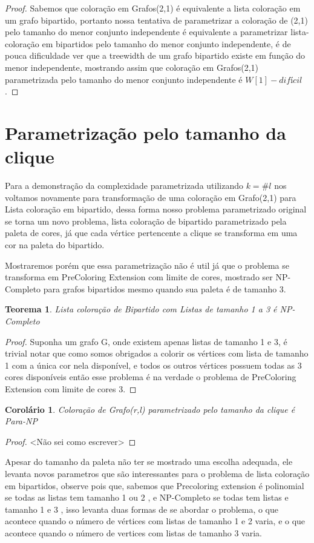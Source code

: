 \documentclass[a4paper,oneside,12pt]{book}
\newtheorem{teorema}{Teorema}
\newtheorem{corolario}{Corolário}
\begin{document}
\begin{proof}
Sabemos que coloração em Grafos(2,1) é equivalente a lista coloração em um grafo bipartido, portanto nossa tentativa de parametrizar a coloração de (2,1) pelo tamanho do menor conjunto independente é equivalente a parametrizar lista-coloração em bipartidos pelo tamanho do menor conjunto independente, é de pouca dificuldade ver que a treewidth de um grafo bipartido existe em função do menor independente, mostrando assim que coloração em Grafos(2,1) parametrizada pelo tamanho do menor conjunto independente é $W[1]-difícil$. 

\end{proof}

\section{Parametrização pelo tamanho da clique}
Para a demonstração da complexidade parametrizada utilizando $k=\#l$ nos voltamos novamente para transformação de uma coloração em Grafo(2,1) para Lista coloração em bipartido, dessa forma nosso problema parametrizado original se torna um novo problema, lista coloração de bipartido parametrizado pela paleta de cores, já que cada vértice pertencente a clique se transforma em uma cor na paleta do bipartido. 

Mostraremos porém que essa parametrização não é util já que o problema se transforma em PreColoring Extension com limite de cores, mostrado ser NP-Completo\cite{Kratochvil94} para grafos bipartidos mesmo quando sua paleta é de tamanho 3.

\begin{teorema}
Lista coloração de Bipartido com Listas de tamanho 1 a 3 é NP-Completo
\end{teorema}
\begin{proof}
Suponha um grafo G, onde existem apenas listas de tamanho 1 e 3, é trivial notar que como somos obrigados a colorir os vértices com lista de tamanho 1 com a única cor nela disponível, e todos os outros vértices possuem todas as 3 cores disponíveis então esse problema é na verdade o problema de PreColoring Extension com limite de cores 3.
\end{proof}
\begin{corolario}
Coloração de Grafo(r,l) parametrizado pelo tamanho da clique é Para-NP
\end{corolario}
\begin{proof}
<Não sei como escrever>
\end{proof}

Apesar do tamanho da paleta não ter se mostrado uma escolha adequada, ele levanta novos parametros que são interessantes para o problema de lista coloração em bipartidos, observe pois que, sabemos que Precoloring extension é polinomial se todas as listas tem tamanho 1 ou 2 \cite{HUJTER93}, e NP-Completo se todas tem listas e tamanho 1 e 3 \cite{Kratochvil94}, isso levanta duas formas de se abordar o problema, o que acontece quando o número de vértices com listas de tamanho 1 e 2 varia, e o que acontece quando o número de vertices com listas de tamanho 3 varia.
\end{document}
